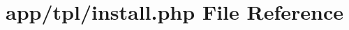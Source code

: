 \hypertarget{tpl_2install_8php}{}\section{app/tpl/install.php File Reference}
\label{tpl_2install_8php}
